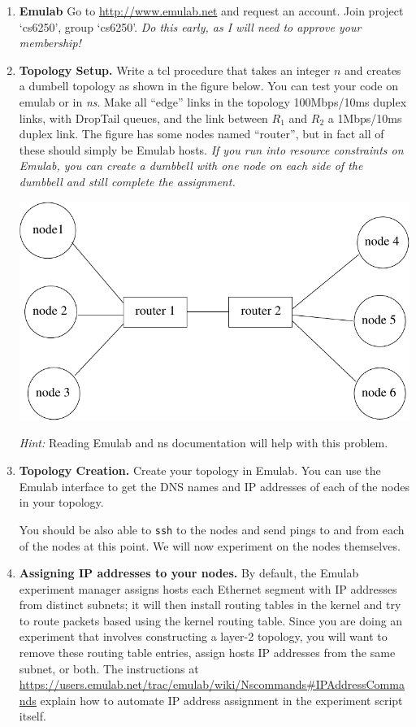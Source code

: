\documentclass[11pt]{article}
\begin{document}
\begin{enumerate}
\itemsep=-1pt
\item{\bf Emulab} Go to \url{http://www.emulab.net} and request an
  account. Join project `cs6250', group `cs6250'.  {\em Do this early, as
    I will need to approve your membership!}

\item{\bf Topology Setup.} Write a tcl procedure that takes an integer
  $n$ and creates a dumbell topology as shown in the figure below.  You
  can test your code on emulab or in {\em ns}.  Make all ``edge'' links
  in the topology 100Mbps/10ms duplex links, with DropTail queues, and
  the link between $R_1$ and $R_2$ a 1Mbps/10ms duplex link.  The figure
  has some nodes named ``router'', but in fact all of these should
  simply be Emulab hosts. {\em If you run into resource constraints on
    Emulab, you can create a dumbbell with one node on each side of the
    dumbbell and still complete the assignment.}

\begin{center}
\includegraphics[width=0.5\linewidth]{db}
\end{center}

  {\em Hint:} Reading Emulab and ns documentation will help with this
  problem.

\item {\bf Topology Creation.} Create your topology in Emulab.  You
  can use the Emulab interface to get the DNS names and IP addresses of
  each of the nodes in your topology.  

  You should be also able to {\tt ssh} to the nodes and send pings to
  and from each of the nodes at this point.  We will now experiment on
  the nodes themselves.

\item {\bf Assigning IP addresses to your nodes.} By default, the Emulab
  experiment manager assigns hosts each Ethernet segment with IP
  addresses from distinct subnets; it will then install routing tables
  in the kernel and try to route packets based using the kernel routing
  table.  Since you are doing an experiment that involves constructing a
  layer-2 topology, you will want to remove these routing table entries,
  assign hosts IP addresses from the same subnet, or both.  The
  instructions at
  \url{https://users.emulab.net/trac/emulab/wiki/Nscommands#IPAddressCommands}
  explain how to automate IP address assignment in the experiment script
  itself.  

\end{enumerate}
\end{document}
